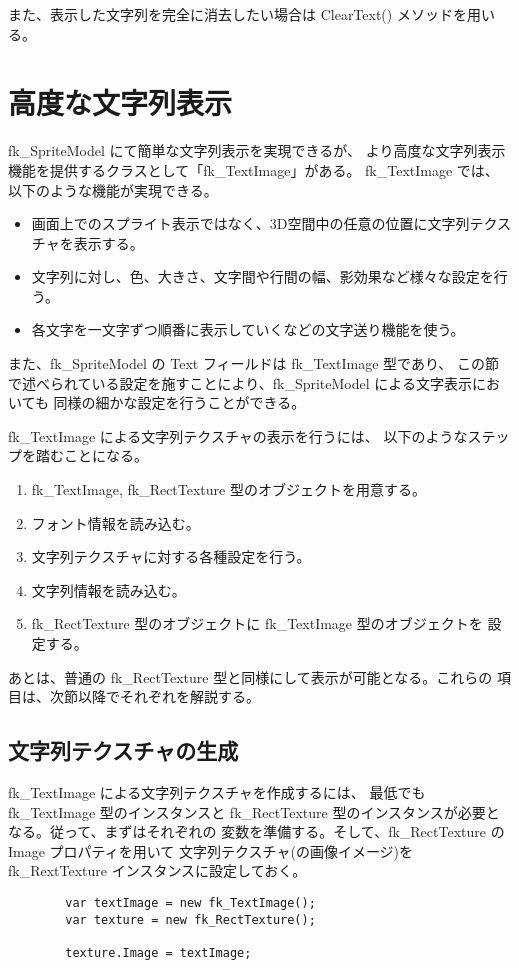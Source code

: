 また、表示した文字列を完全に消去したい場合は ClearText() メソッドを用いる。

\section{高度な文字列表示} \label{sec:textimage}

fk\_SpriteModel にて簡単な文字列表示を実現できるが、
より高度な文字列表示機能を提供するクラスとして「fk\_TextImage」がある。
fk\_TextImage では、以下のような機能が実現できる。
\begin{itemize}
 \item 画面上でのスプライト表示ではなく、3D空間中の任意の位置に文字列テクスチャを表示する。
 \item 文字列に対し、色、大きさ、文字間や行間の幅、影効果など様々な設定を行う。
 \item 各文字を一文字ずつ順番に表示していくなどの文字送り機能を使う。
\end{itemize}
また、fk\_SpriteModel の Text フィールドは fk\_TextImage 型であり、
この節で述べられている設定を施すことにより、fk\_SpriteModel による文字表示においても
同様の細かな設定を行うことができる。

fk\_TextImage による文字列テクスチャの表示を行うには、
以下のようなステップを踏むことになる。
\begin{enumerate}
 \item fk\_TextImage, fk\_RectTexture 型のオブジェクトを用意する。
 \item フォント情報を読み込む。
 \item 文字列テクスチャに対する各種設定を行う。
 \item 文字列情報を読み込む。
 \item fk\_RectTexture 型のオブジェクトに fk\_TextImage 型のオブジェクトを
	設定する。
\end{enumerate}
あとは、普通の fk\_RectTexture 型と同様にして表示が可能となる。これらの
項目は、次節以降でそれぞれを解説する。

\subsection{文字列テクスチャの生成}
fk\_TextImage による文字列テクスチャを作成するには、
最低でも fk\_TextImage 型のインスタンスと
fk\_RectTexture 型のインスタンスが必要となる。従って、まずはそれぞれの
変数を準備する。そして、fk\_RectTexture の Image プロパティを用いて
文字列テクスチャ(の画像イメージ)を fk\_RextTexture インスタンスに設定しておく。
\\
\begin{screen}
\begin{verbatim}
        var textImage = new fk_TextImage();
        var texture = new fk_RectTexture();

        texture.Image = textImage;
\end{verbatim}
\end{screen}

